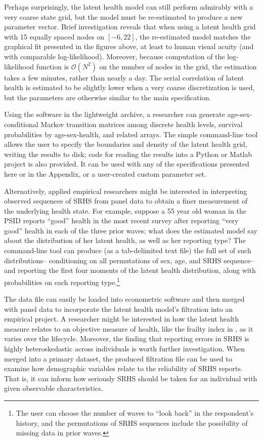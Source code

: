 \documentclass[12pt,pdftex,letterpaper]{article}
\begin{document}
Perhaps surprisingly, the latent health model can still perform admirably with a very coarse state grid, but the model must be re-estimated to produce a new parameter vector. Brief investigation reveals that when using a latent health grid with 15 equally spaced nodes on $[-6,22]$, the re-estimated model matches the graphical fit presented in the figures above, at least to human visual acuity (and with comparable log-likelihood). Moreover, because computation of the log-likelihood function is $\mathcal{O}(N^2)$ on the number of nodes in the grid, the estimation takes a few minutes, rather than nearly a day. The serial correlation of latent health is estimated to be slightly lower when a very coarse discretization is used, but the parameters are otherwise similar to the main specification.

Using the software in the lightweight archive, a researcher can generate age-sex-conditional Markov transition matrices among discrete health levels, survival probabilities by age-sex-health, and related arrays. The simple command-line tool allows the user to specify the boundaries and density of the latent health grid, writing the results to disk; code for reading the results into a Python or Matlab project is also provided. It can be used with any of the specifications presented here or in the Appendix, or a user-created custom parameter set.

Alternatively, applied empirical researchers might be interested in interpreting observed sequences of SRHS from panel data to obtain a finer measurement of the underlying health state. For example, suppose a 55 year old woman in the PSID reports ``good'' health in the most recent survey after reporting ``very good'' health in each of the three prior waves; what does the estimated model say about the distribution of her latent health, as well as her reporting type? The command-line tool can produce (as a tab-delimited text file) the full set of such distributions-- conditioning on all permutations of sex, age, and SRHS sequence-- and reporting the first four moments of the latent health distribution, along with probabilities on each reporting type.\footnote{The user can choose the number of waves to ``look back'' in the respondent's history, and the permutations of SRHS sequences include the possibility of missing data in prior waves.}

The data file can easily be loaded into econometric software and then merged with panel data to incorporate the latent health model's filtration into an empirical project. A researcher might be interested in how the latent health measure relates to an objective measure of health, like the frailty index in \cite{HosseiniZhao21a}, as it varies over the lifecycle. Moreover, the finding that reporting errors in SRHS is highly heteroskedastic across individuals is worth further investigation. When merged into a primary dataset, the produced filtration file can be used to examine how demographic variables relate to the reliability of SRHS reports. That is, it can inform how seriously SRHS should be taken for an individual with given observable characteristics.
\end{document}
